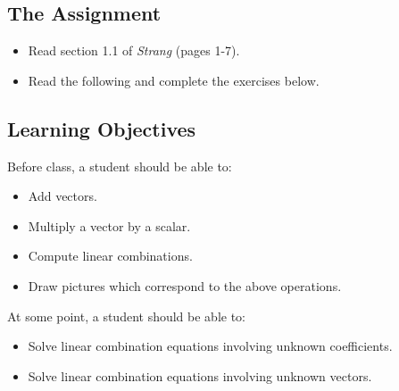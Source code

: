 \documentclass[10pt,]{book}
\theoremstyle{plain}
\theoremstyle{definition}
\numberwithin{equation}{section}
\begin{document}
\subsection[The Assignment]{The Assignment}\label{subsection-1}
\begin{itemize}
\item{}Read section 1.1 of \emph{Strang} (pages 1-7).\item{}Read the following and complete the exercises below.\end{itemize}
\typeout{************************************************}
\typeout{************************************************}
\subsection[Learning Objectives]{Learning Objectives}\label{subsection-2}
Before class, a student should be able to:
      \begin{itemize}
\item{}Add vectors.\item{}Multiply a vector by a scalar.\item{}Compute linear combinations.\item{}Draw pictures which correspond to the above operations.\end{itemize}

      At some point, a student should be able to:
      \begin{itemize}
\item{}Solve linear combination equations involving unknown coefficients.\item{}Solve linear combination equations involving unknown vectors.\end{itemize}

\typeout{************************************************}
\typeout{************************************************}
\end{document}
